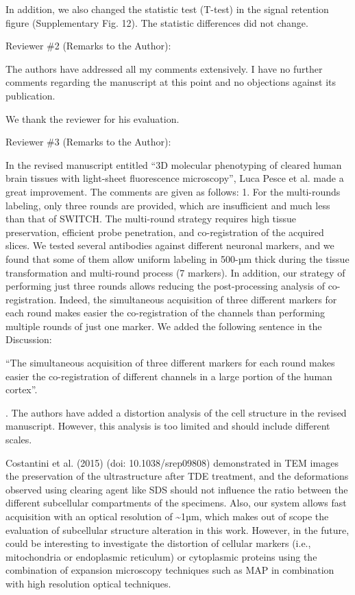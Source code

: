 \documentclass{article}
\begin{document}
\noindent In addition, we also changed the statistic test (T-test) in the signal retention figure (Supplementary Fig. 12). The statistic differences did not change.

\noindent Reviewer \#2 (Remarks to the Author):

\noindent {}The authors have addressed all my comments extensively. I have no further comments regarding the manuscript at this point and no objections against its publication.

\noindent We thank the reviewer for his evaluation.

\noindent Reviewer \#3 (Remarks to the Author):

\noindent In the revised manuscript entitled “3D molecular phenotyping of cleared human brain tissues with light-sheet fluorescence microscopy”, Luca Pesce et al. made a great improvement. The comments are given as follows: 1. For the multi-rounds labeling, only three rounds are provided, which are insufficient and much less than that of SWITCH. The multi-round strategy requires high tissue preservation, efficient probe penetration, and co-registration of the acquired slices. We tested several antibodies against different neuronal markers, and we found that some of them allow uniform labeling in 500-µm thick during the tissue transformation and multi-round process (7 markers). In addition, our strategy of performing just three rounds allows reducing the post-processing analysis of co-registration. Indeed, the simultaneous acquisition of three different markers for each round makes easier the co-registration of the channels than performing multiple rounds of just one marker. We added the following sentence in the Discussion:

\noindent “The simultaneous acquisition of three different markers for each round makes easier the co-registration of different channels in a large portion of the human cortex”.

. The authors have added a distortion analysis of the cell structure in the revised manuscript. However, this analysis is too limited and should include different scales.

\noindent Costantini et al. (2015) (doi: 10.1038/srep09808) demonstrated in TEM images the preservation of the ultrastructure after TDE treatment, and the deformations observed using clearing agent like SDS should not influence the ratio between the different subcellular compartments of the specimens. Also, our system allows fast acquisition with an optical resolution of \textasciitilde{}1µm, which makes out of scope the evaluation of subcellular structure alteration in this work. However, in the future, could be interesting to investigate the distortion of cellular markers (i.e., mitochondria or endoplasmic reticulum) or cytoplasmic proteins using the combination of expansion microscopy techniques such as MAP in combination with high resolution optical techniques.
\end{document}
